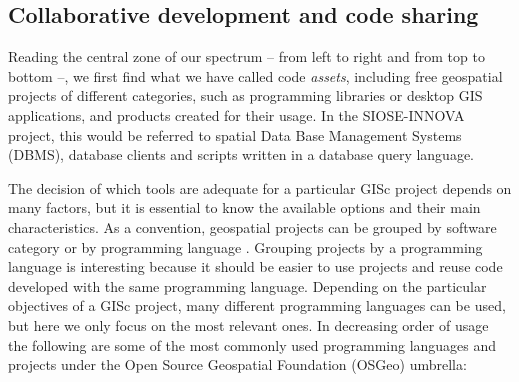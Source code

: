 \documentclass[ijgi,article,submit,moreauthors,pdftex]{Definitions/mdpi}
\begin{document}
\subsection{Collaborative development and code sharing}
\label{subsec:code}

Reading the central zone of our spectrum -- from left to right and from top to bottom --, we first find what we have called code \textit{assets}, including free geospatial projects of different categories, such as programming libraries or desktop GIS applications, and products created for their usage. In the SIOSE-INNOVA project, this would be referred to spatial Data Base Management Systems (DBMS), database clients and scripts written in a database query language.

The decision of which tools are adequate for a particular GISc project depends on many factors, but it is essential to know the available options and their main characteristics. As a convention, geospatial projects can be grouped by software category or by programming language \cite{Steiniger2013, Steiniger2009}. Grouping projects by a programming language is interesting because it should be easier to use projects and reuse code developed with the same programming language. Depending on the particular objectives of a GISc project, many different programming languages can be used, but here we only focus on the most relevant ones. In decreasing order of usage \cite{index2018tiobe} the following are some of the most commonly used programming languages and projects under the Open Source Geospatial Foundation (OSGeo) \cite{osgeo} umbrella:
\end{document}
